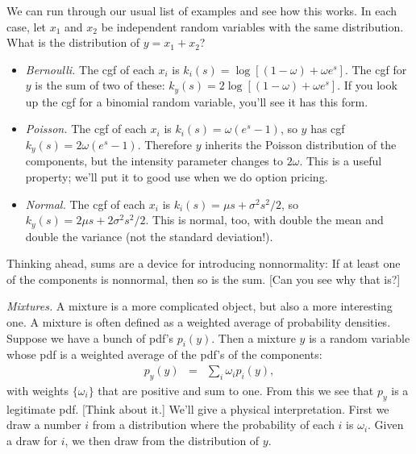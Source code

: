 We can run through our usual list of examples and see how this works.
In each case, let $x_1$ and $x_2$ be independent random variables with the same distribution.
What is the distribution of $y=x_1 + x_2$?
%
\begin{itemize}
\item {\it Bernoulli.\/}
The cgf of each $x_i$ is
$    k_i(s) = \log \left[ (1-\omega) + \omega e^{s} \right] $.
The cgf for $y$ is the sum of two of these:
$    k_y(s) = 2 \log \left[ (1-\omega) + \omega e^{s} \right] $.
If you look up the cgf for a binomial random variable, you'll see it has this form.

\item {\it Poisson.\/}  The cgf of each $x_i$ is
$  k_i(s) = \omega (e^{s}-1)  $,
so $y$ has cgf
$  k_y(s) = 2\omega (e^{s}-1)  $.
Therefore $y$ inherits the Poisson distribution of the components,
but the intensity parameter changes to $2 \omega$.
This is a useful property; we'll put it to good use when we do option pricing.


\item {\it Normal.\/}
The cgf of each $x_i$ is
$    k_i(s) = \mu s + \sigma^2 s^2/2  $,
so $k_y(s) = 2\mu s + 2\sigma^2 s^2/2$.
This is normal, too, with double the mean and double the variance
(not the standard deviation!).
\end{itemize}

Thinking ahead, sums are a device for introducing nonnormality:
If at least one of the components is nonnormal,
then so is the sum.
[Can you see why that is?]

{\it Mixtures.\/}
A  mixture is a more complicated object,
but also a more interesting one.
A mixture is often defined as a weighted average of probability densities.
Suppose we have a bunch of pdf's $p_i(y)$.
Then a mixture $y$ is a random variable whose pdf is a weighted average
of the pdf's of the components:
\begin{eqnarray*}
    p_y(y) &=& \sum_i \omega_i p_i(y) ,
\end{eqnarray*}
with weights $\{\omega_i\}$ that are positive and sum to one.
From this we see that $p_y$ is a legitimate pdf.
[Think about it.]
We'll give a physical interpretation.
First we draw a number $i$ from a distribution where the probability of each $i$
is $\omega_i$.
Given a draw for $i$, we then draw from the distribution of $y$.


